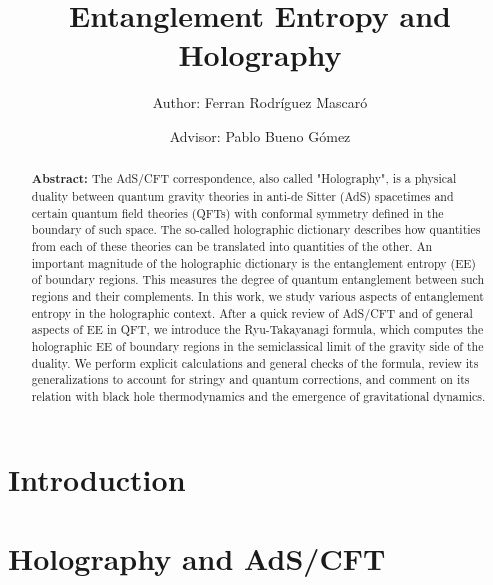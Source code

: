 \documentclass[twocolumn]{revtex4}
\begin{document}
\pagestyle{fancy}


\title{Entanglement Entropy and Holography}
\author{Author: Ferran Rodríguez Mascaró}
\author{Advisor: Pablo Bueno Gómez}


\begin{abstract}
    {\bf Abstract:} The AdS/CFT correspondence, also called "Holography", is a physical duality between quantum gravity theories in anti-de Sitter (AdS) spacetimes and certain quantum field theories (QFTs) with conformal symmetry defined in the boundary of such space. The so-called holographic dictionary describes how quantities from each of these theories can be translated into quantities of the other. An important magnitude of the holographic dictionary is the entanglement entropy (EE) of boundary regions. This measures the degree of quantum entanglement between such regions and their complements. In this work, we study various aspects of entanglement entropy in the holographic context. After a quick review of AdS/CFT and of general aspects of EE in QFT, we introduce the Ryu-Takayanagi formula, which computes the holographic EE of boundary regions in the semiclassical limit of the gravity side of the duality. We perform explicit calculations and general checks of the formula, review its generalizations to account for stringy and quantum corrections, and comment on its relation with black hole thermodynamics and the emergence of gravitational dynamics.
\end{abstract}


\maketitle


\section{Introduction} \label{s:Intro}






\newpage


\section{Holography and AdS/CFT}
\end{document}

